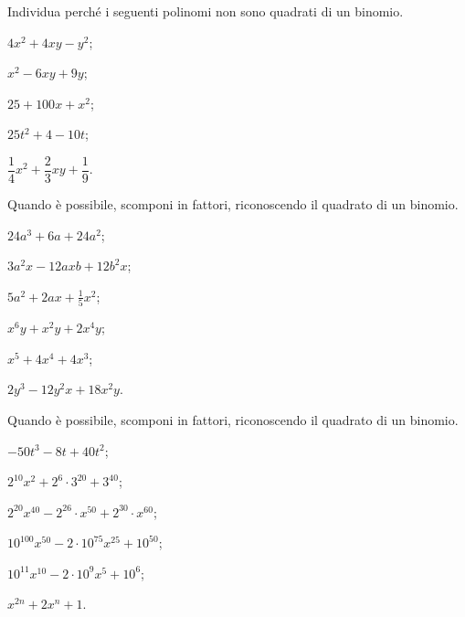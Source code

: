 \begin{esercizio}
\label{ese:13.30}
Individua perché i seguenti polinomi non sono quadrati di un binomio.
\begin{multicols}{3}
\begin{enumeratea}
 \item $4x^{2}+4xy-y^{2}$; %
 \item $x^{2}-6xy+9y$; %
 \item $25+100x+x^{2}$; %
 \item $25t^{2}+4-10t$; %
 \item $\dfrac{1}{4}x^{2}+\dfrac{2}{3}xy+\dfrac{1}{9}$. %
\end{enumeratea}
\end{multicols}
\end{esercizio}
\pagebreak
\begin{esercizio}[\Ast]
\label{ese:13.31}
Quando è possibile, scomponi in fattori, riconoscendo il quadrato di un binomio.
\begin{multicols}{3}
\begin{enumeratea}
 \item $24a^{3}+6a+24a^{2}$;
 \item $3a^{2}x-12axb+12b^{2}x$;
 \item $5a^{2}+2ax+\frac{1}{5}x^{2}$;
 \item $x^{6}y+x^{2}y+2x^{4}y$;
 \item $x^{5}+4x^{4}+4x^{3}$;
 \item $2y^{3}-12y^{2}x+18x^{2}y$.
\end{enumeratea}
\end{multicols}
\end{esercizio}

\begin{esercizio}[\Ast]
\label{ese:13.32}
Quando è possibile, scomponi in fattori, riconoscendo il quadrato di un binomio.
\begin{multicols}{2}
\begin{enumeratea}
 \item $-50t^{3}-8t+40t^{2}$;
 \item $2^{10}x^{2}+2^{6}\cdot 3^{20}+3^{40}$;
 \item $2^{20}x^{40}-2^{26}\cdot x^{50}+2^{30}\cdot x^{60}$;
 \item $10^{100}x^{50}-2\cdot 10^{75}x^{25}+10^{50}$;
 \item $10^{11}x^{10}-2\cdot 10^{9}x^{5}+10^{6}$;
 \item $x^{2n}+2x^{n}+1$.
\end{enumeratea}
\end{multicols}
\end{esercizio}

